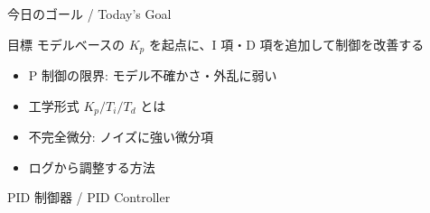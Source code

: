 \documentclass[aspectratio=169, 14pt]{beamer}
\begin{document}
\begin{frame}
  \titlepage
\end{frame}

\begin{frame}{今日のゴール / Today's Goal}
  \begin{block}{目標}
    モデルベースの $K_p$ を起点に、I 項・D 項を追加して制御を改善する
  \end{block}

  \vspace{0.8em}

  \begin{itemize}
    \item P 制御の限界: モデル不確かさ・外乱に弱い
    \item 工学形式 $K_p / T_i / T_d$ とは
    \item 不完全微分: ノイズに強い微分項
    \item ログから調整する方法
  \end{itemize}
\end{frame}

\begin{frame}{PID 制御器 / PID Controller}
  \begin{center}
    \resizebox{0.78\textwidth}{!}{}
  \end{center}
\end{frame}
\end{document}
